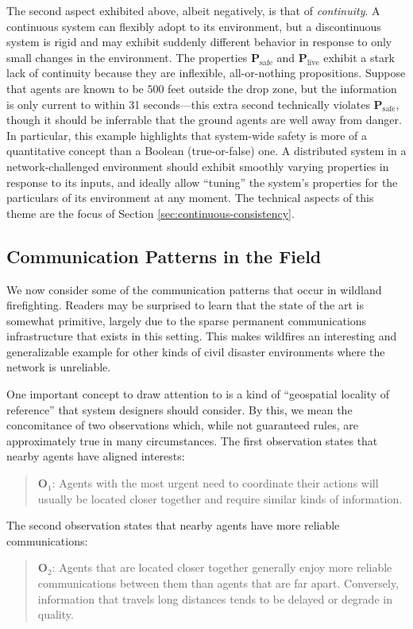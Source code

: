 \documentclass[]             %
{NASA}                       %
\theoremstyle{definition}
\begin{document}
The second aspect exhibited above, albeit negatively, is that of
\emph{continuity}. A continuous system can flexibly adopt to its
environment, but a discontinuous system is rigid and may exhibit
suddenly different behavior in response to only small changes in the
environment. The properties $\mathbf{P}_\textrm{safe}$ and
$\mathbf{P}_\textrm{live}$ exhibit a stark lack of continuity because
they are inflexible, all-or-nothing propositions. Suppose that agents
are known to be $500$ feet outside the drop zone, but the information
is only current to within 31 seconds---this extra second technically
violates $\mathbf{P}_\textrm{safe}$, though it should be inferrable
that the ground agents are well away from danger. In particular, this
example highlights that system-wide safety is more of a quantitative
concept than a Boolean (true-or-false) one. A distributed system in a
network-challenged environment should exhibit smoothly varying
properties in response to its inputs, and ideally allow ``tuning'' the
system's properties for the particulars of its environment at any
moment. The technical aspects of this theme are the focus of Section
\ref{sec:continuous-consistency}.

\subsection{Communication Patterns in the Field}
\label{ssec:communication-patterns}
We now consider some of the communication patterns that occur in
wildland firefighting. Readers may be surprised to learn that the
state of the art is somewhat primitive, largely due to the sparse
permanent communications infrastructure that exists in this
setting. This makes wildfires an interesting and generalizable example
for other kinds of civil disaster environments where the network is
unreliable.

One important concept to draw attention to is a kind of ``geospatial
locality of reference'' that system designers should consider. By
this, we mean the concomitance of two observations which, while not
guaranteed rules, are approximately true in many circumstances. The
first observation states that nearby agents have aligned interests:
\begin{quote}
  $\textbf{O}_1$: Agents with the most urgent need to coordinate their
  actions will usually be located closer together and require similar
  kinds of information.
\end{quote}
The second observation states that nearby agents have more reliable
communications:
\begin{quote}
  $\textbf{O}_2$: Agents that are located closer together generally
  enjoy more reliable communications between them than agents that are
  far apart. Conversely, information that travels long distances tends to
  be delayed or degrade in quality.
\end{quote}
\end{document}
